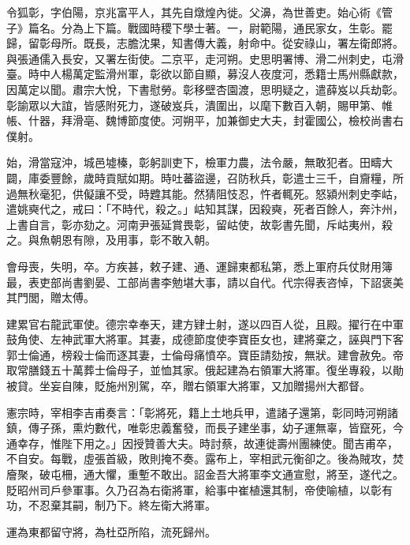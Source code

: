 
\begin{pinyinscope}

 令狐彰，字伯陽，京兆富平人，其先自燉煌內徙。父濞，為世善吏。始心術《管子》篇名。分為上下篇。戰國時稷下學士著。一，尉範陽，通民家女，生彰。罷歸，留彰母所。既長，志膽沈果，知書傳大義，射命中。從安祿山，署左衛郎將。與張通儒入長安，又署左街使。二京平，走河朔。史思明署博、滑二州刺史，屯滑臺。時中人楊萬定監滑州軍，彰欲以節自顯，募沒人夜度河，悉籍士馬州縣獻款，因萬定以聞。肅宗大悅，下書慰勞。彰移壁杏園渡，思明疑之，遣薛岌以兵劫彰。彰諭眾以大誼，皆感附死力，遂破岌兵，潰圍出，以麾下數百入朝，賜甲第、帷帳、什器，拜滑亳、魏博節度使。河朔平，加兼御史大夫，封霍國公，檢校尚書右僕射。



 始，滑當寇沖，城邑墟榛，彰躬訓吏下，檢軍力農，法令嚴，無敢犯者。田疇大闢，庫委豐餘，歲時貢賦如期。時吐蕃盜邊，召防秋兵，彰遣士三千，自齎糧，所過無秋毫犯，供儗讓不受，時韙其能。然猜阻忮忍，忤者輒死。怒潁州刺史李岵，遣姚奭代之，戒曰：「不時代，殺之。」岵知其謀，因殺奭，死者百餘人，奔汴州，上書自言，彰亦劾之。河南尹張延賞畏彰，留岵使，故彰書先聞，斥岵夷州，殺之。與魚朝恩有隙，及用事，彰不敢入朝。



 會母喪，失明，卒。方疾甚，敕子建、通、運歸東都私第，悉上軍府兵仗財用簿最，表吏部尚書劉晏、工部尚書李勉堪大事，請以自代。代宗得表咨悼，下詔褒美其門閭，贈太傅。



 建累官右龍武軍使。德宗幸奉天，建方肄士射，遂以四百人從，且殿。擢行在中軍鼓角使、左神武軍大將軍。其妻，成德節度使李寶臣女也，建將棄之，誣與門下客郭士倫通，榜殺士倫而逐其妻，士倫母痛憤卒。寶臣請劾按，無狀。建會赦免。帝取常膳錢五十萬葬士倫母子，並恤其家。俄起建為右領軍大將軍。復坐專殺，以勛被貸。坐妄自陳，貶施州別駕，卒，贈右領軍大將軍，又加贈揚州大都督。



 憲宗時，宰相李吉甫奏言：「彰將死，籍上土地兵甲，遣諸子還第，彰同時河朔諸鎮，傳子孫，熏灼數代，唯彰忠義奮發，而長子建坐事，幼子運無辜，皆竄死，今通幸存，惟陛下用之。」因授贊善大夫。時討蔡，故連徙壽州團練使。聞吉甫卒，不自安。每戰，虛張首級，敗則掩不奏。露布上，宰相武元衡卻之。後為賊攻，焚廥聚，破屯柵，通大懼，重塹不敢出。詔金吾大將軍李文通宣慰，將至，遂代之。貶昭州司戶參軍事。久乃召為右衛將軍，給事中崔植還其制，帝使喻植，以彰有功，不忍棄其嗣，制乃下。終左衛大將軍。



 運為東都留守將，為杜亞所陷，流死歸州。




\end{pinyinscope}
